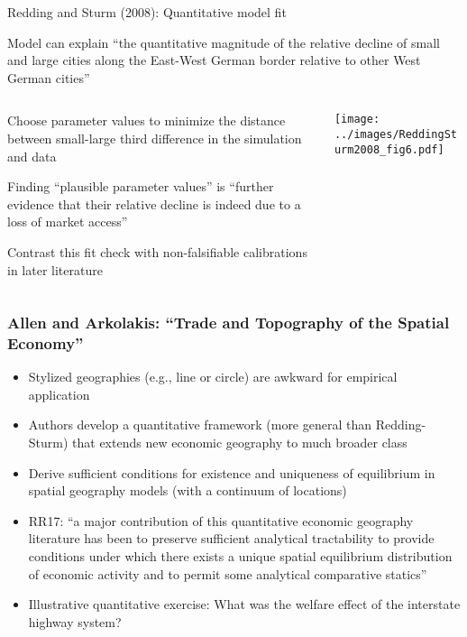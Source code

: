 \documentclass[11pt,notes=hide,aspectratio=169]{beamer}
\begin{document}
\begin{frame}{Redding and Sturm (2008): Quantitative model fit}
{\small Model can explain ``the quantitative magnitude of the relative decline of small and large cities along the East-West German border relative to other West German cities''\par}
\begin{columns}
\begin{column}{0.45\textwidth}
	\begin{itemize}
	{\small
	\item Choose parameter values to minimize the distance between small-large third difference in the simulation and data
	\item Finding ``plausible parameter values'' is ``further evidence that their relative decline is indeed due to a loss of market access''
	\item Contrast this fit check with non-falsifiable calibrations in later literature
	\par}
\end{itemize}
\end{column}
\begin{column}{0.53\textwidth}
\texttt{[image: ../images/ReddingSturm2008\_fig6.pdf]}
\end{column}
\end{columns}
\end{frame}
\begin{frame}
\frametitle{Allen and Arkolakis: ``Trade and Topography of the Spatial Economy''}
\begin{itemize}
\item Stylized geographies (e.g., line or circle) are awkward for empirical application
\item Authors develop a quantitative framework (more general than Redding-Sturm) that extends new economic geography to much broader class
\item Derive sufficient conditions for existence and uniqueness of equilibrium in spatial geography models (with a continuum of locations)
\item RR17: ``a major contribution of this quantitative economic geography literature has been to preserve sufficient analytical tractability to provide conditions under which there exists a unique spatial equilibrium distribution of economic activity and to permit some analytical comparative statics''
\item Illustrative quantitative exercise: What was the welfare effect of the interstate highway system?
\end{itemize}
\end{frame}
\end{document}
